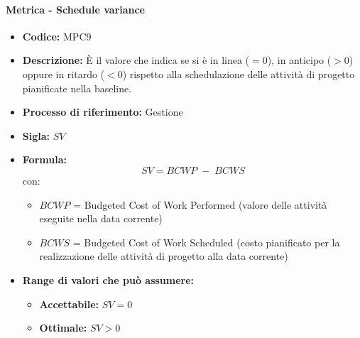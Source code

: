     \paragraph{Metrica - Schedule variance}
    \begin{itemize}
        \item \textbf{Codice:} MPC9
        \item \textbf{Descrizione:} È il valore che indica se si è in linea ($=0$), in anticipo ($>0$) oppure in ritardo ($<0$) rispetto alla schedulazione delle attività di progetto pianificate nella baseline.
        \item \textbf{Processo di riferimento:} Gestione
        \item \textbf{Sigla:} $SV$
        \item \textbf{Formula:} $$SV = {BCWP \; - \; BCWS}$$
        con:
        \begin{itemize}
            \item $BCWP$ = Budgeted Cost of Work Performed (valore delle attività eseguite nella data corrente)
            \item $BCWS$ = Budgeted Cost of Work Scheduled (costo pianificato per la realizzazione delle attività di progetto alla data corrente)
        \end{itemize}
        \item \textbf{Range di valori che può assumere:}
        \begin{itemize}
            \item \textbf{Accettabile:} $SV = 0$
            \item \textbf{Ottimale:} $SV > 0$
        \end{itemize}
    \end{itemize}

